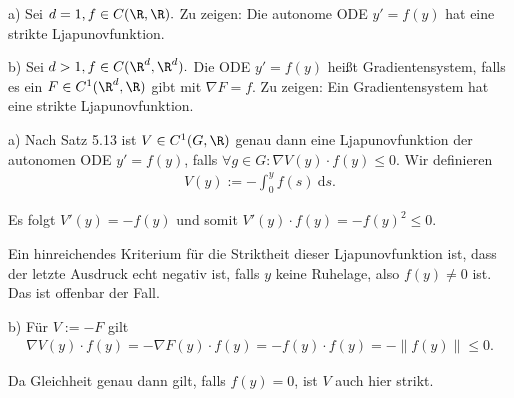 \begin{exercise}
  a) Sei $d = 1, f \in C(\R, \R).$ Zu zeigen: Die autonome ODE $y' = f(y)$ hat eine strikte Ljapunovfunktion.

  b) Sei $d > 1, f \in C(\R^d, \R^d).$ Die ODE $y' = f(y)$ heißt Gradientensystem, falls es ein $F \in C^1(\R^d, \R)$ gibt mit $\nabla F = f$. Zu zeigen: Ein Gradientensystem hat eine strikte Ljapunovfunktion.
\end{exercise}

\begin{solution}
  a) Nach Satz 5.13 ist $V \in C^1(G, \R)$ genau dann eine Ljapunovfunktion der autonomen ODE $y' = f(y)$, falls $\forall g \in G: \nabla V(y) \cdot f(y) \leq 0$. Wir definieren
  \begin{align}
      V(y) := -\int_0^y f(s)~ \mathrm{d}s.
  \end{align}

  Es folgt $V'(y) = -f(y)$ und somit $V'(y) \cdot f(y) = -f(y)^2 \leq 0.$

  Ein hinreichendes Kriterium für die Striktheit dieser Ljapunovfunktion ist, dass der letzte Ausdruck echt negativ ist, falls $y$ keine Ruhelage, also $f(y) \neq 0$ ist. Das ist offenbar der Fall.

  b) Für $V := -F$ gilt
  \begin{align}
      \nabla V(y) \cdot f(y) = - \nabla F(y) \cdot f(y) = - f(y) \cdot f(y) = - \| f(y) \| \leq 0.
  \end{align}

  Da Gleichheit genau dann gilt, falls $f(y) = 0$, ist $V$ auch hier strikt.
\end{solution}
